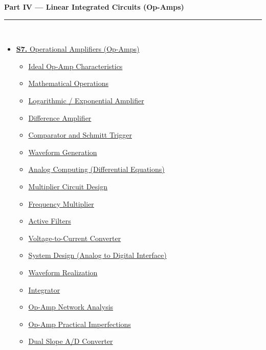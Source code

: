 \documentclass[12pt]{article}
\begin{document}
\vspace{6pt}

\begin{tcolorbox}[breakable,colback=cE!5,colframe=cE,boxrule=1pt,arc=5pt,
  left=8pt,right=8pt,top=8pt,bottom=8pt,before skip=4pt]
  {\large\bfseries\textcolor{cE}{Part IV --- Linear Integrated Circuits (Op-Amps)}}\\[5pt]
  \textcolor{cE!40}{\rule{\textwidth}{0.4pt}}\\[3pt]
  \small\begin{itemize}[leftmargin=1.2em,itemsep=1pt,label={\textcolor{cE}{$\triangleright$}}]
    \item \hyperref[sec:S7]{\textbf{S7.} Operational Amplifiers (Op-Amps)}
      \begin{itemize}[leftmargin=1.5em,itemsep=0pt,label={\textcolor{cE}{$\cdot$}}]
        \item \hyperref[sub:s7-ideal]{Ideal Op-Amp Characteristics}
        \item \hyperref[sub:s7-math]{Mathematical Operations}
        \item \hyperref[sub:s7-log]{Logarithmic / Exponential Amplifier}
        \item \hyperref[sub:s7-diff]{Difference Amplifier}
        \item \hyperref[sub:s7-schmitt]{Comparator and Schmitt Trigger}
        \item \hyperref[sub:s7-wave]{Waveform Generation}
        \item \hyperref[sub:s7-analog]{Analog Computing (Differential Equations)}
        \item \hyperref[sub:s7-mult]{Multiplier Circuit Design}
        \item \hyperref[sub:s7-freqmult]{Frequency Multiplier}
        \item \hyperref[sub:s7-filters]{Active Filters}
        \item \hyperref[sub:s7-v2i]{Voltage-to-Current Converter}
        \item \hyperref[sub:s7-sysdesign]{System Design (Analog to Digital Interface)}
        \item \hyperref[sub:s7-wavereal]{Waveform Realization}
        \item \hyperref[sub:s7-integrator]{Integrator}
        \item \hyperref[sub:s7-network]{Op-Amp Network Analysis}
        \item \hyperref[sub:s7-imperfections]{Op-Amp Practical Imperfections}
        \item \hyperref[sub:s7-adc]{Dual Slope A/D Converter}
      \end{itemize}
  \end{itemize}
\end{tcolorbox}
\end{document}
